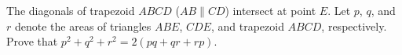 The diagonals of trapezoid $ABCD$ ($AB \parallel CD$) intersect at point $E$. Let $p$, $q$, and $r$ denote the areas of triangles $ABE$, $CDE$, and trapezoid $ABCD$, respectively. Prove that $p^{2}+q^{2}+r^{2}=2(pq+qr+rp)$.
